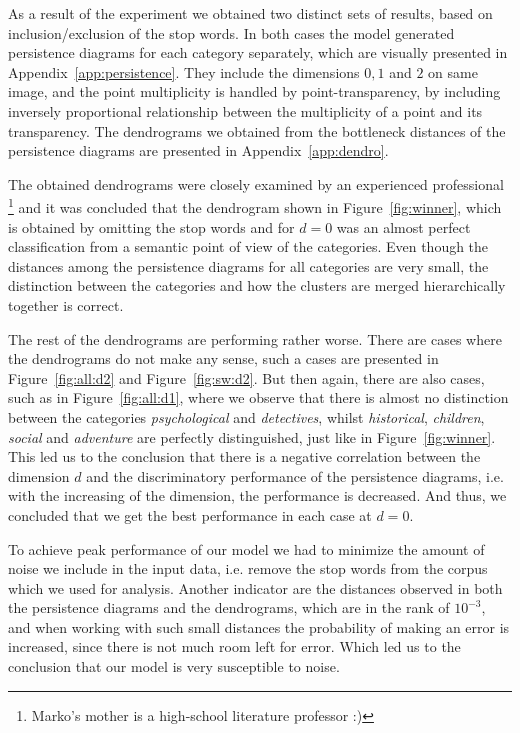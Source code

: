 \documentclass[fleqn]{article}
\begin{document}
	As a result of the experiment we obtained two distinct sets of results, based on inclusion/exclusion of the stop words. In both cases the model generated persistence diagrams for each category separately, which are visually presented in Appendix~\ref{app:persistence}. They include the dimensions $0, 1$ and $2$ on same image, and the point multiplicity is handled by point-transparency, by including inversely proportional relationship between the multiplicity of a point and its transparency.
	The dendrograms we obtained from the bottleneck distances of the persistence diagrams are presented in Appendix~\ref{app:dendro}.
	
	The obtained dendrograms were closely examined by an experienced professional \footnote{Marko's mother is a high-school literature professor :)} and it was concluded that the dendrogram shown in Figure~\ref{fig:winner}, which is obtained by omitting the stop words and for $d = 0$ was an almost perfect classification from a semantic point of view of the categories. Even though the distances among the persistence diagrams for all categories are very small, the distinction between the categories and how the clusters are merged hierarchically together is correct.
	
	The rest of the dendrograms are performing rather worse. There are cases where the dendrograms do not make any sense, such a cases are presented in Figure~\ref{fig:all:d2} and Figure~\ref{fig:sw:d2}. But then again, there are also cases, such as in Figure~\ref{fig:all:d1}, where we observe that there is almost no distinction between the categories \textit{psychological} and \textit{detectives}, whilst \textit{historical}, \textit{children}, \textit{social} and \textit{adventure} are perfectly distinguished, just like in Figure~\ref{fig:winner}. This led us to the conclusion that there is a negative correlation between the dimension $d$ and the discriminatory performance of the persistence diagrams, i.e. with the increasing of the dimension, the performance is decreased. And thus, we concluded that we get the best performance in each case at $d = 0$.
	
	To achieve peak performance of our model we had to minimize the amount of noise we include in the input data, i.e. remove the stop words from the corpus which we used for analysis. Another indicator are the distances observed in both the persistence diagrams and the dendrograms, which are in the rank of $10^{-3}$, and when working with such small distances the probability of making an error is increased, since there is not much room left for error. Which led us to the conclusion that our model is very susceptible to noise.
	
\end{document}
